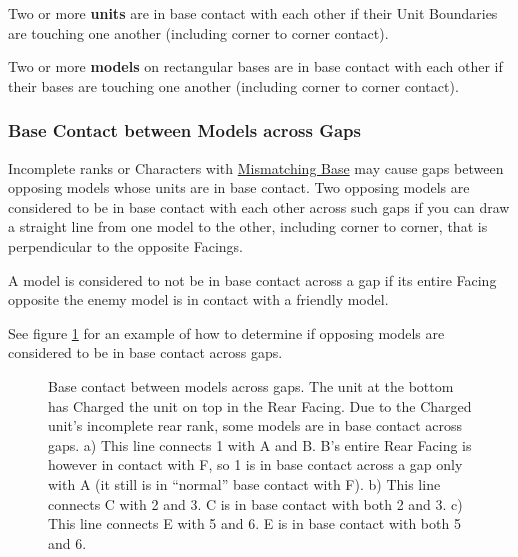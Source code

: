 Two or more \textbf{units} are in base contact with each other if their Unit Boundaries are touching one another (including corner to corner contact).

Two or more \textbf{models} on rectangular bases are in base contact with each other if their bases are touching one another (including corner to corner contact).

\subsubsection{Base Contact between Models across Gaps}
\label{base_contact_between_models_across_gaps}

Incomplete ranks or Characters with \hyperref[mismatching_bases]{Mismatching Base} may cause gaps between opposing models whose units are in base contact. Two opposing models are considered to be in base contact with each other across such gaps if you can draw a straight line from one model to the other, including corner to corner, that is perpendicular to the opposite Facings.

A model is considered to not be in base contact across a gap if its entire Facing opposite the enemy model is in contact with a friendly model.

See figure \ref{figure/contact_across_gaps} for an example of how to determine if opposing models are considered to be in base contact across gaps.

\begin{figure}[!htbp]
	\begin{minipage}{0.33\textwidth}
	\def\svgwidth{\textwidth}
	
	\end{minipage}\hfill\begin{minipage}{0.65\textwidth}
	\caption{Base contact between models across gaps.\captionpar
	The unit at the bottom has Charged the unit on top in the Rear Facing. Due to the Charged unit's incomplete rear rank, some models are in base contact across gaps.\captionpar
	a) This line connects 1 with A and B. B's entire Rear Facing is however in contact with F, so 1 is in base contact across a gap only with A (it still is in \enquote{normal} base contact with F).\captionpar
	b) This line connects C with 2 and 3. C is in base contact with both 2 and 3.\captionpar
	c) This line connects E with 5 and 6. E is in base contact with both 5 and 6.%
	}
	\label{figure/contact_across_gaps}
	\end{minipage}
\end{figure}

